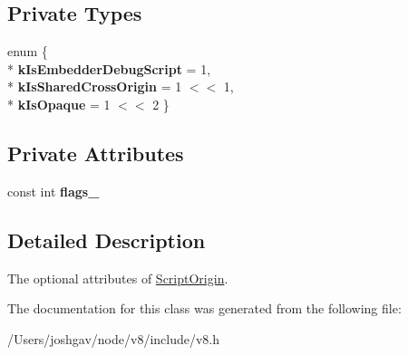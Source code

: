 \subsection*{Private Types}
\begin{DoxyCompactItemize}
\item 
enum \{ \\*
{\bfseries k\+Is\+Embedder\+Debug\+Script} = 1, 
\\*
{\bfseries k\+Is\+Shared\+Cross\+Origin} = 1 $<$$<$ 1, 
\\*
{\bfseries k\+Is\+Opaque} = 1 $<$$<$ 2
 \}\hypertarget{classv8_1_1_script_origin_options_a78e493d360bd11b748318dc40656ad1e}{}\label{classv8_1_1_script_origin_options_a78e493d360bd11b748318dc40656ad1e}

\end{DoxyCompactItemize}
\subsection*{Private Attributes}
\begin{DoxyCompactItemize}
\item 
const int {\bfseries flags\+\_\+}\hypertarget{classv8_1_1_script_origin_options_aa35317c743b5c38dcb92cc7cd7563791}{}\label{classv8_1_1_script_origin_options_aa35317c743b5c38dcb92cc7cd7563791}

\end{DoxyCompactItemize}


\subsection{Detailed Description}
The optional attributes of \hyperlink{classv8_1_1_script_origin}{Script\+Origin}. 

The documentation for this class was generated from the following file\+:\begin{DoxyCompactItemize}
\item 
/\+Users/joshgav/node/v8/include/v8.\+h\end{DoxyCompactItemize}

